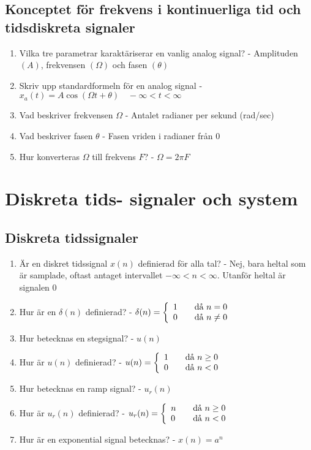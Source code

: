 \documentclass[11pt]{report}
\begin{document}
\section{Konceptet för frekvens i kontinuerliga tid och tidsdiskreta signaler}
\begin{enumerate}
	\item Vilka tre parametrar karaktäriserar en vanlig analog signal? - Amplituden $(A)$, frekvensen $(\Omega)$ och fasen $(\theta)$
	\item Skriv upp standardformeln för en analog signal - $x_a(t)=A \cos(\Omega t + \theta) \quad -\infty < t < \infty$
	\item Vad beskriver frekvensen $\Omega$ - Antalet radianer per sekund (rad/sec) 
	\item Vad beskriver fasen $\theta$ - Fasen vriden i radianer från $0$
	\item Hur konverteras $\Omega$ till frekvens $F$? - $\Omega = 2\pi F$ 
\end{enumerate}

\chapter{Diskreta tids- signaler och system}
\section{Diskreta tidssignaler}
\begin{enumerate}
	\item Är en diskret tidssignal $x(n)$ definierad för alla tal? - Nej, bara heltal som är samplade, oftast antaget intervallet $-\infty < n < \infty$. Utanför heltal är signalen $0$
	\item Hur är en $\delta (n)$ definierad? - $\delta (n) = \left\{ \begin{array}{l l}
		1 & \quad \text{då } n=0 \\
		0 & \quad \text{då } n \neq 0
	\end{array}\right.$
	\item Hur betecknas en stegsignal? - $u(n)$
	\item Hur är $u(n)$ definierad? - $u(n) = \left\{ \begin{array}{l l}
		1 & \quad \text{då } n \geq 0 \\
		0 & \quad \text{då } n < 0
	\end{array}\right.$
	\item Hur betecknas en ramp signal? - $u_r(n)$
	\item Hur är $u_r(n)$ definierad? -  $u_r(n) = \left\{ \begin{array}{l l}
		n & \quad \text{då } n \geq 0 \\
		0 & \quad \text{då } n < 0
	\end{array}\right.$
	\item Hur är en exponential signal betecknas? - $x(n)=a^n$
\end{enumerate}
\end{document}
